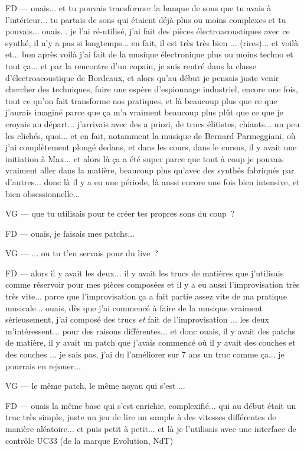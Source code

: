 FD — ouais... et tu pouvais transformer la banque de sons que tu avais à l'intérieur... tu partais de sons qui étaient déjà plus ou moins complexes et tu pouvais... ouais... je l'ai ré-utilisé, j'ai fait des pièces électroacoustiques avec ce synthé, il n'y a pas si longtemps... en fait, il est très très bien ... (rires)... et voilà et... bon après voilà j'ai fait de la musique électronique plus ou moins techno et tout ça... et par la rencontre d'un copain, je suis rentré dans la classe d'électroacoustique de Bordeaux, et alors qu'au début je pensais juste venir chercher des techniques, faire une espère d'espionnage industriel, encore une fois, tout ce qu'on fait transforme nos pratiques, et là beaucoup plus que ce que j'aurais imaginé parce que ça m'a vraiment beaucoup plus plût que ce que je croyais au départ... j'arrivais avec des a priori, de trucs élitistes, chiants... un peu les clichés, quoi... et en fait, notamment la musique de Bernard Parmeggiani, où j'ai complètement plongé dedans, et dans les cours, dans le cursus, il y avait une initiation à Max... et alors là ça a été super parce que tout à coup je pouvais vraiment aller dans la matière, beaucoup plus qu'avec des synthés fabriqués par d'autres... donc là il y a eu une période, là aussi encore une fois bien intensive, et  bien obsessionnelle... 

VG — que tu utilisais pour te créer tes propres sons du coup ? 

FD — ouais, je faisais mes patchs... 

VG — ... ou tu t'en servais pour du live ?  

FD — alors il y avait les deux... il y avait les trucs de matières que j'utilisais comme réservoir pour mes pièces composées et il y a eu aussi l'improvisation très très vite... parce que l'improvisation ça a fait partie assez vite de ma pratique musicale... ouais, dès que j'ai commencé à faire de la musique vraiment sérieusement, j'ai composé des trucs \emph{et} fait de l'improvisation ... les deux m'intéressent... pour des raisons différentes... et donc ouais, il y avait des patchs de matière, il y avait un patch que j'avais commencé où il y avait des couches et des couches ... je sais pas, j'ai du l'améliorer sur 7 ans un truc comme ça... je pourrais en rejouer... 

VG — le même patch, le même noyau qui s'est ... 

FD — ouais la même base qui s'est enrichie, complexifié... qui au début était un truc très simple, juste un jeu de lire un sample à des vitesses différentes de manière aléatoire... et puis petit à petit... et là je l'utilisais avec une interface de contrôle UC33 (de la marque Evolution, NdT)  

